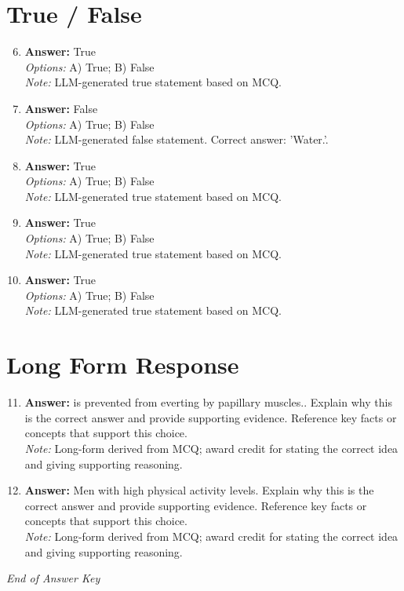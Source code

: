 \documentclass[12pt]{article}
\begin{document}
\section*{True / False}
\begin{enumerate}[label=\arabic*.]
\setcounter{enumi}{5}
\item \textbf{Answer:} True
\\ \textit{Options:} A) True; B) False
\\ \textit{Note:} LLM-generated true statement based on MCQ.
\item \textbf{Answer:} False
\\ \textit{Options:} A) True; B) False
\\ \textit{Note:} LLM-generated false statement. Correct answer: 'Water.'.
\item \textbf{Answer:} True
\\ \textit{Options:} A) True; B) False
\\ \textit{Note:} LLM-generated true statement based on MCQ.
\item \textbf{Answer:} True
\\ \textit{Options:} A) True; B) False
\\ \textit{Note:} LLM-generated true statement based on MCQ.
\item \textbf{Answer:} True
\\ \textit{Options:} A) True; B) False
\\ \textit{Note:} LLM-generated true statement based on MCQ.
\end{enumerate}

\section*{Long Form Response}
\begin{enumerate}[label=\arabic*.]
\setcounter{enumi}{10}
\item \textbf{Answer:} is prevented from everting by papillary muscles.. Explain why this is the correct answer and provide supporting evidence. Reference key facts or concepts that support this choice.
\\ \textit{Note:} Long-form derived from MCQ; award credit for stating the correct idea and giving supporting reasoning.
\item \textbf{Answer:} Men with high physical activity levels. Explain why this is the correct answer and provide supporting evidence. Reference key facts or concepts that support this choice.
\\ \textit{Note:} Long-form derived from MCQ; award credit for stating the correct idea and giving supporting reasoning.
\end{enumerate}

\vfill
\noindent\textit{End of Answer Key}
\end{document}
